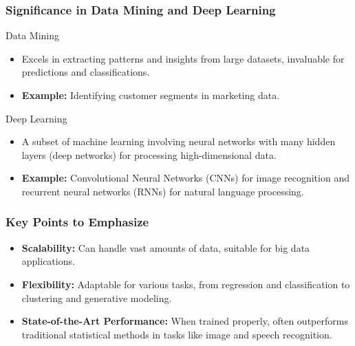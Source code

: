 \documentclass[aspectratio=169]{beamer}
\begin{document}
\begin{frame}[fragile]
    \frametitle{Significance in Data Mining and Deep Learning}
    \begin{block}{Data Mining}
        \begin{itemize}
            \item Excels in extracting patterns and insights from large datasets, invaluable for predictions and classifications.
            \item \textbf{Example:} Identifying customer segments in marketing data.
        \end{itemize}
    \end{block}
    
    \begin{block}{Deep Learning}
        \begin{itemize}
            \item A subset of machine learning involving neural networks with many hidden layers (deep networks) for processing high-dimensional data.
            \item \textbf{Example:} Convolutional Neural Networks (CNNs) for image recognition and recurrent neural networks (RNNs) for natural language processing.
        \end{itemize}
    \end{block}
\end{frame}

\begin{frame}[fragile]
    \frametitle{Key Points to Emphasize}
    \begin{itemize}
        \item \textbf{Scalability:} Can handle vast amounts of data, suitable for big data applications.
        \item \textbf{Flexibility:} Adaptable for various tasks, from regression and classification to clustering and generative modeling.
        \item \textbf{State-of-the-Art Performance:} When trained properly, often outperforms traditional statistical methods in tasks like image and speech recognition.
    \end{itemize}
\end{frame}
\end{document}
